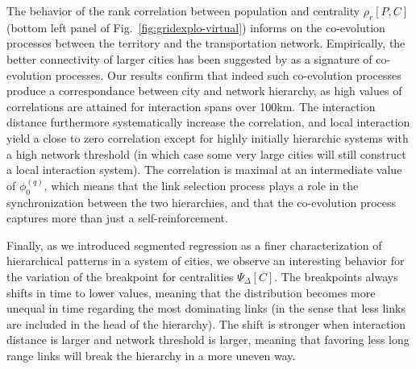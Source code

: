 \documentclass[11pt]{article}
\begin{document}
The behavior of the rank correlation between population and centrality $\rho_r \left[P, C \right]$ (bottom left panel of Fig.~\ref{fig:gridexplo-virtual}) informs on the co-evolution processes between the territory and the transportation network. Empirically, the better connectivity of larger cities has been suggested by \cite{bretagnolle2003vitesse} as a signature of co-evolution processes. Our results confirm that indeed such co-evolution processes produce a correspondance between city and network hierarchy, as high values of correlations are attained for interaction spans over 100km. The interaction distance furthermore systematically increase the correlation, and local interaction yield a close to zero correlation except for highly initially hierarchic systems with a high network threshold (in which case some very large cities will still construct a local interaction system). The correlation is maximal at an intermediate value of $\phi_0^{(q)}$, which means that the link selection process plays a role in the synchronization between the two hierarchies, and that the co-evolution process captures more than just a self-reinforcement.

Finally, as we introduced segmented regression as a finer characterization of hierarchical patterns in a system of cities, we observe an interesting behavior for the variation of the breakpoint for centralities $\Psi_{\Delta}\left[C\right]$. The breakpoints always shifts in time to lower values, meaning that the distribution becomes more unequal in time regarding the most dominating links (in the sense that less links are included in the head of the hierarchy). The shift is stronger when interaction distance is larger and network threshold is larger, meaning that favoring less long range links will break the hierarchy in a more uneven way.
\end{document}
